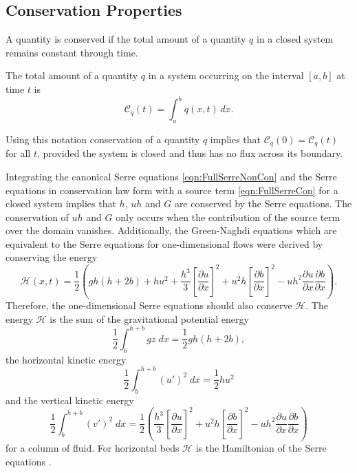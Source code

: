 \subsection{Conservation Properties}
A quantity is conserved if the total amount of a quantity $q$ in a closed system remains constant through time.
\begin{defn}
	\label{defn:TotalAmmountab}
	The total amount of a quantity $q$ in a system occurring on the interval $[a,b]$ at time $t$ is
	\begin{equation*}
	\mathcal{C}_q(t) = \int_{a}^{b} q(x,t)\, dx.
	\end{equation*}
\end{defn}
Using this notation conservation of a quantity $q$ implies that $\mathcal{C}_{q}(0) = \mathcal{C}_{q}(t)$ for all $t$, provided the system is closed and thus has no flux across its boundary. 

Integrating the canonical Serre equations \eqref{eqn:FullSerreNonCon} and the Serre equations in conservation law form with a source term \eqref{eqn:FullSerreCon} for a closed system implies that $h$, $uh$ and $G$ are conserved by the Serre equations. The conservation of $uh$ and $G$ only occurs when the contribution of the source term over the domain vanishes. Additionally, the Green-Naghdi equations \cite{Green-Naghdi-1976-237} which are equivalent to the Serre equations for one-dimensional flows were derived by conserving the energy
\begin{equation*}
	\mathcal{H}(x,t) = \frac{1}{2} \left( gh\left(h + 2b\right) + hu^2  + \frac{h^3}{3} \left[\frac{\partial u}{\partial x}\right]^2 + u^2h\left[\frac{\partial b}{\partial x}\right]^2 - uh^2 \frac{\partial u}{\partial x} \frac{\partial b}{\partial x}  \right).
	\label{eqn:Hamildef}
\end{equation*}
Therefore, the one-dimensional Serre equations should also conserve $\mathcal{H}$. The energy $\mathcal{H}$ is the sum of the gravitational potential energy
\[\frac{1}{2}\int_{b}^{h +b} gz \; dx = \frac{1}{2}gh\left(h + 2b\right),\]
the horizontal kinetic energy
\[\frac{1}{2}\int_{b}^{h +b} (u')^2 \; dx = \frac{1}{2}hu^2\]
and the vertical kinetic energy
\[\frac{1}{2}\int_{b}^{h +b} (v')^2 \; dx = \frac{1}{2} \left(\frac{h^3}{3} \left[\frac{\partial u}{\partial x}\right]^2 + u^2h\left[\frac{\partial b}{\partial x}\right]^2 - uh^2 \frac{\partial u}{\partial x} \frac{\partial b}{\partial x} \right)\]
for a column of fluid. For horizontal beds $\mathcal{H}$ is the Hamiltonian of the Serre equations \cite{Li-Y-2002}.


